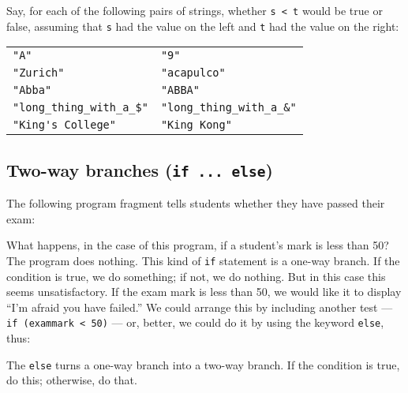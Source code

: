 Say, for each of the following pairs of strings, whether \verb!s < t! would be
true or false, assuming that  \verb!s! had the value on the left and \verb!t!
had the value on the right:

\begin{tabular}{ll}
\verb!"A"! & \verb!"9"!\\
\verb!"Zurich"! & \verb!"acapulco"!\\
\verb!"Abba"! & \verb!"ABBA"!\\
\verb!"long_thing_with_a_$"! & \verb!"long_thing_with_a_&"!\\
\verb!"King's College"! & \verb!"King Kong"!\\
\end{tabular}

\subsection{Two-way branches (\texttt{if ... else})}
\label{sec:two-way-branches}

The following program fragment tells students whether they have passed
their exam: 


What happens, in the case of this program, if a student's mark is
less than 50?  The program does nothing.  This kind of \verb!if! statement is a
one-way branch.  If the condition is true, we do something; if not, we do
nothing.  But in this case
this seems unsatisfactory.  If the exam mark is less than 50, we would like
it to display ``I'm afraid you have failed.''  We could arrange this by
including another test --- \verb!if (exammark < 50)!  --- or, better, we could
do it by using the keyword \verb!else!, thus:


The  \verb!else! turns a one-way branch into a two-way branch.  If the
condition is true, do this; otherwise, do that.





